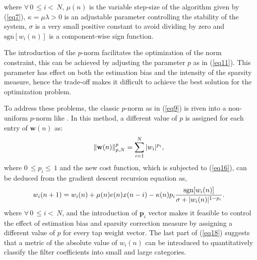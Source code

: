 \noindent where $\forall \hspace{2pt} 0\hspace{2pt}\leq i<\hspace{2pt}N$, $\mu(n)$ is the variable step-size of the algorithm given by (\ref{eq7}),
$\kappa=\mu\lambda>0$ is an adjustable parameter controlling the stability of the system, $\sigma$ is a very small positive constant to avoid dividing
by zero and $\mathrm{sgn}[w_{i}(n)]$ is a component-wise sign function.

\vspace{-0.5cm}
\noindent The introduction of the $p$-norm facilitates the optimization of the norm constraint, this can be achieved by adjusting the parameter $p$ as in (\ref{eq11}). This parameter has effect on both the estimation bias and  the intensity of the sparsity measure, hence the trade-off makes it difficult to achieve the best solution for the optimization problem.

\vspace{-0.5cm}
\par
\noindent To address these problems, the  classic $p$-norm as in (\ref{eq9}) is riven into a non-uniform $p$-norm like \cite{Tong}. In this method, a different value
of $p$ is assigned for each entry of $\textbf{w}(n)$ as:
\vspace{-0.1cm}
\begin{equation}
\|\textbf{w}(n)\|_{p,N}^p=\sum_{i=1}^{N}|w_i|^{p_i},\label{eq17}\vspace{-0.1cm}
\end{equation}
\noindent where $0\hspace{2pt}\leq p_i\leq\hspace{2pt}1$ and the new cost function, which is subjected to (\ref{eq16}), can be deduced from the gradient
descent recursion equation as,
\vspace{-0.1cm}
\begin{equation}
w_{i}(n+1)= w_{i}(n)+\mu(n) e(n)x(n-i)-\kappa(n) p_{i}\frac{\mathrm{sgn}[w_{i}(n)]}{\sigma+|w_{i}(n)|^{1-p_{i}}}.\label{eq18}\vspace{-0.1cm}
\end{equation}
%
\noindent where $\forall\hspace{2pt} 0\hspace{2pt}\leq i<\hspace{2pt}N$, and the introduction of $\textbf{p}_{i}$ vector makes it feasible to control the effect of estimation bias and sparsity correction measure by assigning a different value of $p$ for every tap weight vector. The last part of (\ref{eq18}) suggests that a metric of the absolute value of $w_i(n)$ can be introduced to quantitatively classify the filter coefficients into small and large categories.

